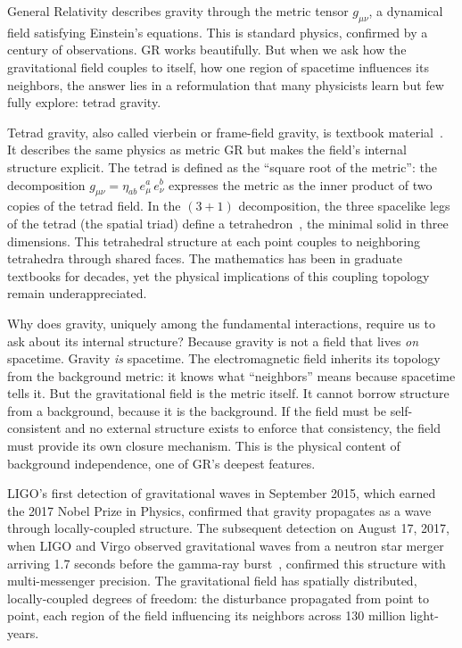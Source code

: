 \documentclass[aps,prd,preprint,superscriptaddress,showpacs,preprintnumbers,amsmath,amssymb,nofootinbib]{revtex4-2}
\begin{document}
General Relativity describes gravity through the metric tensor $g_{\mu\nu}$, a dynamical field satisfying Einstein's equations. This is standard physics, confirmed by a century of observations. GR works beautifully. But when we ask how the gravitational field couples to itself, how one region of spacetime influences its neighbors, the answer lies in a reformulation that many physicists learn but few fully explore: tetrad gravity.

Tetrad gravity, also called vierbein or frame-field gravity, is textbook material~\cite{mtw1973,wald1984}. It describes the same physics as metric GR but makes the field's internal structure explicit. The tetrad is defined as the ``square root of the metric'': the decomposition $g_{\mu\nu} = \eta_{ab}\,e^a_\mu\,e^b_\nu$ expresses the metric as the inner product of two copies of the tetrad field. In the $(3{+}1)$ decomposition, the three spacelike legs of the tetrad (the spatial triad) define a tetrahedron~\cite{barbieri1998}, the minimal solid in three dimensions. This tetrahedral structure at each point couples to neighboring tetrahedra through shared faces. The mathematics has been in graduate textbooks for decades, yet the physical implications of this coupling topology remain underappreciated.

Why does gravity, uniquely among the fundamental interactions, require us to ask about its internal structure? Because gravity is not a field that lives \emph{on} spacetime. Gravity \emph{is} spacetime. The electromagnetic field inherits its topology from the background metric: it knows what ``neighbors'' means because spacetime tells it. But the gravitational field is the metric itself. It cannot borrow structure from a background, because it is the background. If the field must be self-consistent and no external structure exists to enforce that consistency, the field must provide its own closure mechanism. This is the physical content of background independence, one of GR's deepest features.

LIGO's first detection of gravitational waves in September 2015, which earned the 2017 Nobel Prize in Physics, confirmed that gravity propagates as a wave through locally-coupled structure. The subsequent detection on August 17, 2017, when LIGO and Virgo observed gravitational waves from a neutron star merger arriving 1.7 seconds before the gamma-ray burst~\cite{gw170817}, confirmed this structure with multi-messenger precision. The gravitational field has spatially distributed, locally-coupled degrees of freedom: the disturbance propagated from point to point, each region of the field influencing its neighbors across 130 million light-years.
\end{document}
